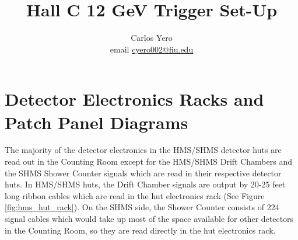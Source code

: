 \documentclass[11pt]{article}
\begin{document}
\newcommand{\hhodthrs}{-44.5 mV }       %
\newcommand{\hhodgate}{60 ns }
\newcommand{\hPrShLo}{-40 mV }
\newcommand{\hPrShHi}{-60 mV }
\newcommand{\hSHLo}{-45 mV }
\newcommand{\hPrShLogate}{30 ns }
\newcommand{\hPrShHigate}{30 ns }
\newcommand{\hSHLogate}{30 ns }
\newcommand{\hcerthrs}{-50 mV }
\newcommand{\hcergate}{30 ns }

\newcommand{\shodthrs}{-30 mV }
\newcommand{\quartzthrs}{-60 mV }
\newcommand{\shodgate}{60 ns } 
\newcommand{\sngcthrs}{-50 mV}
\newcommand{\sngcgate}{30 ns}
\newcommand{\shgcthrs}{-50 mV}
\newcommand{\shgcgate}{30 ns}
\newcommand{\saerthrs}{-50 mV}
\newcommand{\saergate}{30 ns}
\newcommand{\comment}[1]{}

\title{\LARGE \bf{Hall C 12 GeV Trigger Set-Up}}

\author{Carlos Yero \\ email \href{mailto:cyero002@fiu.edu}{cyero002@fiu.edu}}

\maketitle



\section{Detector Electronics Racks and Patch Panel Diagrams}
The majority of the detector electronics in the HMS/SHMS detector huts are read out in the Counting Room except for the HMS/SHMS Drift
Chambers and the SHMS Shower Counter signals which are read in their respective detector huts. In HMS/SHMS huts, the Drift
Chamber signals are output by 20-25 feet long ribbon cables which are read in the hut electronics rack (See Figure \ref{fig:hms_hut_rack}). On the SHMS
side, the Shower Counter consists of 224 signal cables which would take up most of the space available for other detectors
in the Counting Room, so they are read directly in the hut electronics rack.
\end{document}
